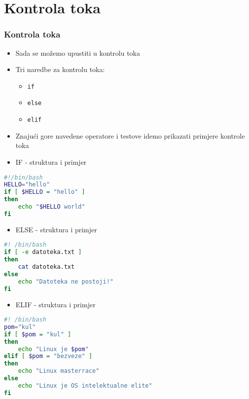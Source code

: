 \documentclass{beamer}
\newcommand{\shell}[1]{\texttt{#1}}
\begin{document}
\section{Kontrola toka}
\begin{frame}
\frametitle{Kontrola toka}
\begin{itemize}
	\item Sada se možemo upustiti u kontrolu toka
	\item Tri naredbe za kontrolu toka:
	\begin{itemize}
		\item \shell{if}
		\item \shell{else}
		\item \shell{elif}
	\end{itemize}
	\item Znajući gore navedene operatore i testove idemo prikazati primjere kontrole toka
\end{itemize}
\end{frame}
\begin{itemize}
	\item IF - struktura i primjer
\end{itemize}
	\begin{lstlisting}[language=bash]
#!/bin/bash
HELLO="hello"
if [ $HELLO = "hello" ]
then
	echo "$HELLO world"
fi
	\end{lstlisting}
\begin{itemize}
	\item ELSE - struktura i primjer
\end{itemize}
	
	\begin{lstlisting}[language=bash]
#! /bin/bash
if [ -e datoteka.txt ]
then
	cat datoteka.txt
else
	echo "Datoteka ne postoji!"
fi
	\end{lstlisting}
\begin{itemize}
	\item ELIF - struktura i primjer
\end{itemize}
	
	\begin{lstlisting}[language=bash]
#! /bin/bash
pom="kul"
if [ $pom = "kul" ]
then
	echo "Linux je $pom"
elif [ $pom = "bezveze" ]
then 
	echo "Linux masterrace"
else
	echo "Linux je OS intelektualne elite"
fi
	\end{lstlisting}
\end{document}
